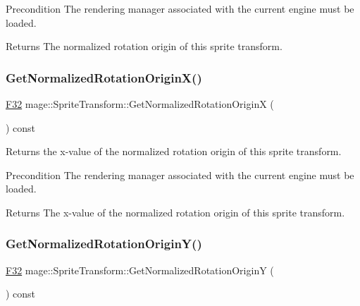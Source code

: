 \begin{DoxyPrecond}{Precondition}
The rendering manager associated with the current engine must be loaded. 
\end{DoxyPrecond}
\begin{DoxyReturn}{Returns}
The normalized rotation origin of this sprite transform. 
\end{DoxyReturn}
\hypertarget{structmage_1_1_sprite_transform_a44a0577d7c136650027da9f5b8a6be77}{}\label{structmage_1_1_sprite_transform_a44a0577d7c136650027da9f5b8a6be77} 
\subsubsection{\texorpdfstring{Get\+Normalized\+Rotation\+Origin\+X()}{GetNormalizedRotationOriginX()}}
{\footnotesize\ttfamily \hyperlink{namespacemage_aa97e833b45f06d60a0a9c4fc22ae02c0}{F32} mage\+::\+Sprite\+Transform\+::\+Get\+Normalized\+Rotation\+OriginX (\begin{DoxyParamCaption}{ }\end{DoxyParamCaption}) const}

Returns the x-\/value of the normalized rotation origin of this sprite transform.

\begin{DoxyPrecond}{Precondition}
The rendering manager associated with the current engine must be loaded. 
\end{DoxyPrecond}
\begin{DoxyReturn}{Returns}
The x-\/value of the normalized rotation origin of this sprite transform. 
\end{DoxyReturn}
\hypertarget{structmage_1_1_sprite_transform_afc002a5d0357c2dc638cc166904446d1}{}\label{structmage_1_1_sprite_transform_afc002a5d0357c2dc638cc166904446d1} 
\subsubsection{\texorpdfstring{Get\+Normalized\+Rotation\+Origin\+Y()}{GetNormalizedRotationOriginY()}}
{\footnotesize\ttfamily \hyperlink{namespacemage_aa97e833b45f06d60a0a9c4fc22ae02c0}{F32} mage\+::\+Sprite\+Transform\+::\+Get\+Normalized\+Rotation\+OriginY (\begin{DoxyParamCaption}{ }\end{DoxyParamCaption}) const}

